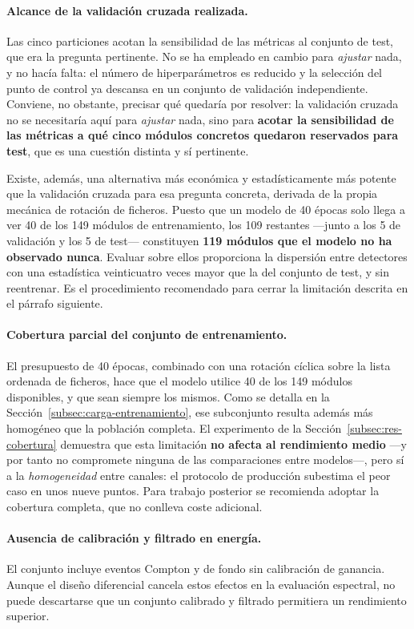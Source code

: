 \paragraph{Alcance de la validación cruzada realizada.} Las cinco particiones acotan la
sensibilidad de las métricas al conjunto de test, que era la pregunta pertinente. No se ha
empleado en cambio para \emph{ajustar} nada, y no hacía falta: el número de hiperparámetros
es reducido y la selección del punto de control ya descansa en un conjunto de validación
independiente. Conviene, no obstante, precisar qué quedaría por
resolver: la validación cruzada no se necesitaría aquí para \emph{ajustar} nada, sino para
\textbf{acotar la sensibilidad de las métricas a qué cinco módulos concretos quedaron reservados
para test}, que es una cuestión distinta y sí pertinente.

Existe, además, una alternativa más económica y estadísticamente más potente que la validación
cruzada para esa pregunta concreta, derivada de la propia mecánica de rotación de ficheros. Puesto
que un modelo de 40 épocas solo llega a ver 40 de los 149 módulos de entrenamiento, los 109
restantes ---junto a los 5 de validación y los 5 de test--- constituyen \textbf{119 módulos que el
modelo no ha observado nunca}. Evaluar sobre ellos proporciona la dispersión entre detectores con
una estadística veinticuatro veces mayor que la del conjunto de test, y sin reentrenar. Es el
procedimiento recomendado para cerrar la limitación descrita en el párrafo siguiente.

\paragraph{Cobertura parcial del conjunto de entrenamiento.} El presupuesto de 40 épocas, combinado
con una rotación cíclica sobre la lista ordenada de ficheros, hace que el modelo utilice 40 de los
149 módulos disponibles, y que sean siempre los mismos. Como se detalla en la
Sección~\ref{subsec:carga-entrenamiento}, ese subconjunto resulta además más homogéneo que la
población completa. El experimento de la Sección~\ref{subsec:res-cobertura} demuestra que esta
limitación \textbf{no afecta al rendimiento medio} ---y por tanto no compromete ninguna de las
comparaciones entre modelos---, pero sí a la \emph{homogeneidad} entre canales: el protocolo de
producción subestima el peor caso en unos nueve puntos. Para trabajo posterior se recomienda adoptar
la cobertura completa, que no conlleva coste adicional.

\paragraph{Ausencia de calibración y filtrado en energía.} El conjunto incluye eventos Compton y de
fondo sin calibración de ganancia. Aunque el diseño diferencial cancela estos efectos en la
evaluación espectral, no puede descartarse que un conjunto calibrado y filtrado permitiera un
rendimiento superior.

